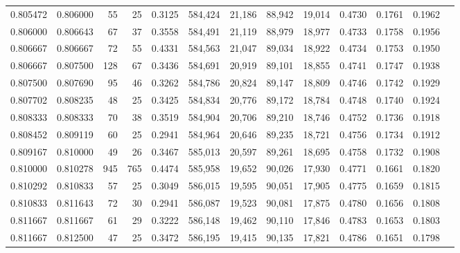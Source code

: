 \begin{tabular}{rrrrrrrrrrrrr}
0.805472 & 0.806000 &    55 &  25 &                                     0.3125 & 584,424 &  21,186 &  88,942 &  19,014 & 0.4730 & 0.1761 & 0.1962 \\
0.806000 & 0.806643 &    67 &  37 &                                     0.3558 & 584,491 &  21,119 &  88,979 &  18,977 & 0.4733 & 0.1758 & 0.1956 \\
0.806667 & 0.806667 &    72 &  55 &                                     0.4331 & 584,563 &  21,047 &  89,034 &  18,922 & 0.4734 & 0.1753 & 0.1950 \\
0.806667 & 0.807500 &   128 &  67 &                                     0.3436 & 584,691 &  20,919 &  89,101 &  18,855 & 0.4741 & 0.1747 & 0.1938 \\
0.807500 & 0.807690 &    95 &  46 &                                     0.3262 & 584,786 &  20,824 &  89,147 &  18,809 & 0.4746 & 0.1742 & 0.1929 \\
0.807702 & 0.808235 &    48 &  25 &                                     0.3425 & 584,834 &  20,776 &  89,172 &  18,784 & 0.4748 & 0.1740 & 0.1924 \\
0.808333 & 0.808333 &    70 &  38 &                                     0.3519 & 584,904 &  20,706 &  89,210 &  18,746 & 0.4752 & 0.1736 & 0.1918 \\
0.808452 & 0.809119 &    60 &  25 &                                     0.2941 & 584,964 &  20,646 &  89,235 &  18,721 & 0.4756 & 0.1734 & 0.1912 \\
0.809167 & 0.810000 &    49 &  26 &                                     0.3467 & 585,013 &  20,597 &  89,261 &  18,695 & 0.4758 & 0.1732 & 0.1908 \\
0.810000 & 0.810278 &   945 & 765 &                                     0.4474 & 585,958 &  19,652 &  90,026 &  17,930 & 0.4771 & 0.1661 & 0.1820 \\
0.810292 & 0.810833 &    57 &  25 &                                     0.3049 & 586,015 &  19,595 &  90,051 &  17,905 & 0.4775 & 0.1659 & 0.1815 \\
0.810833 & 0.811643 &    72 &  30 &                                     0.2941 & 586,087 &  19,523 &  90,081 &  17,875 & 0.4780 & 0.1656 & 0.1808 \\
0.811667 & 0.811667 &    61 &  29 &                                     0.3222 & 586,148 &  19,462 &  90,110 &  17,846 & 0.4783 & 0.1653 & 0.1803 \\
0.811667 & 0.812500 &    47 &  25 &                                     0.3472 & 586,195 &  19,415 &  90,135 &  17,821 & 0.4786 & 0.1651 & 0.1798 \\

\end{tabular}
